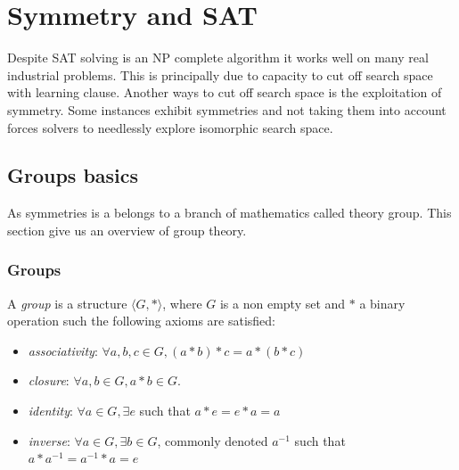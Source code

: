 \chapter{Symmetry and SAT}\label{chap:symmetryinsat}


Despite SAT solving is an NP complete algorithm it works well on many real industrial problems. This is 
principally due to capacity to cut off search space with learning clause. Another ways to cut off 
search space is the exploitation of symmetry. Some instances exhibit symmetries and not taking them into account 
forces solvers to needlessly explore isomorphic search space.  




\section{Groups basics}

As symmetries is a belongs to a branch of mathematics called theory group.
This section give us an overview of group theory.


\subsection{Groups}

A \emph{group} is a structure $\langle G, * \rangle$, where $G$ is a non empty set and $*$ a binary
operation such the following axioms are satisfied:
\begin{itemize}[noitemsep,nolistsep]
	\item \emph{associativity}: $\forall a, b, c \in G, (a * b) * c = a * (b * c)$
	\item \emph{closure}: $\forall a, b \in G, a * b \in G$.
	\item \emph{identity}: $\forall a \in G, \exists e$ such that $ a * e = e * a = a$
	\item \emph{inverse}:  $\forall a \in G, \exists b \in G$, commonly denoted $a^{-1}$ such that
	$a * a^{-1} = a^{-1} * a = e$
\end{itemize}

